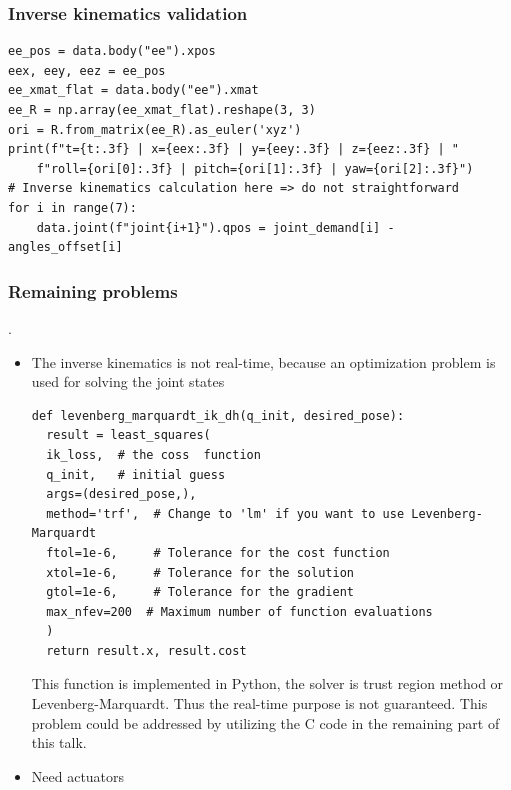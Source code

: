 \documentclass[9pt]{beamer}
\begin{document}
		\begin{frame}[fragile]
			            
			\frametitle{Inverse kinematics validation}
					\begin{verbatim}
ee_pos = data.body("ee").xpos
eex, eey, eez = ee_pos
ee_xmat_flat = data.body("ee").xmat
ee_R = np.array(ee_xmat_flat).reshape(3, 3)
ori = R.from_matrix(ee_R).as_euler('xyz')
print(f"t={t:.3f} | x={eex:.3f} | y={eey:.3f} | z={eez:.3f} | "
	f"roll={ori[0]:.3f} | pitch={ori[1]:.3f} | yaw={ori[2]:.3f}")
# Inverse kinematics calculation here => do not straightforward
for i in range(7):
	data.joint(f"joint{i+1}").qpos = joint_demand[i] - angles_offset[i]
			\end{verbatim}
		
			\begin{figure}
				\scalebox{0.7}{}
			\end{figure}

		\end{frame}
	
	
		\begin{frame}[fragile]
			\frametitle{Remaining problems}
			.\begin{itemize}
				\item The inverse kinematics is not real-time, because an optimization problem is used for solving the joint states
				\begin{verbatim}
def levenberg_marquardt_ik_dh(q_init, desired_pose):
  result = least_squares(
  ik_loss, 	# the coss  function
  q_init, 	# initial guess
  args=(desired_pose,), 
  method='trf',  # Change to 'lm' if you want to use Levenberg-Marquardt
  ftol=1e-6,     # Tolerance for the cost function
  xtol=1e-6,     # Tolerance for the solution
  gtol=1e-6,     # Tolerance for the gradient
  max_nfev=200  # Maximum number of function evaluations
  )
  return result.x, result.cost
				\end{verbatim}
				This function is implemented in Python, the solver is trust region method or Levenberg-Marquardt. Thus the real-time purpose is not guaranteed. This problem could be addressed by utilizing the C code in the remaining part of this talk.
				\item Need actuators
			\end{itemize}
		\end{frame}
	
	
\end{document}
